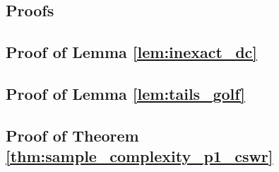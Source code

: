 \begin{subappendices}
    \section{Proofs}

    \subsection{Proof of Lemma \ref{lem:inexact_dc}}\label{ap:proof_inexact_dc}
    

    \subsection{Proof of Lemma \ref{lem:tails_golf}}\label{ap:proof_tails_golf}
    

    \subsection{Proof of Theorem \ref{thm:sample_complexity_p1_cswr}}\label{ap:proof_sample_complexity_p1_cswr}
    
\end{subappendices}